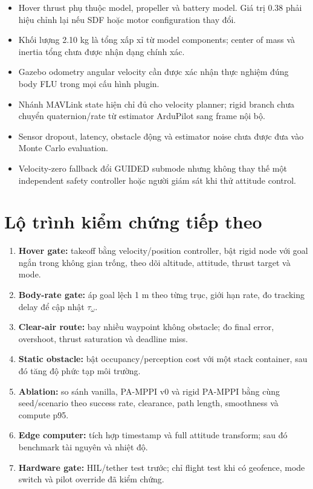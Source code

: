 \documentclass[11pt,a4paper]{article}
\begin{document}
\begin{itemize}
  \item Hover thrust phụ thuộc model, propeller và battery model. Giá trị 0.38
  phải hiệu chỉnh lại nếu SDF hoặc motor configuration thay đổi.
  \item Khối lượng 2.10 kg là tổng xấp xỉ từ model components; center of mass
  và inertia tổng chưa được nhận dạng chính xác.
  \item Gazebo odometry angular velocity cần được xác nhận thực nghiệm đúng
  body FLU trong mọi cấu hình plugin.
  \item Nhánh MAVLink state hiện chỉ đủ cho velocity planner; rigid branch chưa
  chuyển quaternion/rate từ estimator ArduPilot sang frame nội bộ.
  \item Sensor dropout, latency, obstacle động và estimator noise chưa được đưa
  vào Monte Carlo evaluation.
  \item Velocity-zero fallback đổi GUIDED submode nhưng không thay thế một
  independent safety controller hoặc người giám sát khi thử attitude control.
\end{itemize}

\section{Lộ trình kiểm chứng tiếp theo}

\begin{enumerate}
  \item \textbf{Hover gate:} takeoff bằng velocity/position controller, bật
  rigid node với goal ngắn trong không gian trống, theo dõi altitude, attitude,
  thrust target và mode.
  \item \textbf{Body-rate gate:} áp goal lệch 1 m theo từng trục, giới hạn rate,
  đo tracking delay để cập nhật $\tau_\omega$.
  \item \textbf{Clear-air route:} bay nhiều waypoint không obstacle; đo final
  error, overshoot, thrust saturation và deadline miss.
  \item \textbf{Static obstacle:} bật occupancy/perception cost với một stack
  container, sau đó tăng độ phức tạp môi trường.
  \item \textbf{Ablation:} so sánh vanilla, PA-MPPI v0 và rigid PA-MPPI bằng
  cùng seed/scenario theo success rate, clearance, path length, smoothness và
  compute p95.
  \item \textbf{Edge computer:} tích hợp timestamp và full attitude transform;
  sau đó benchmark tài nguyên và nhiệt độ.
  \item \textbf{Hardware gate:} HIL/tether test trước; chỉ flight test khi có
  geofence, mode switch và pilot override đã kiểm chứng.
\end{enumerate}
\end{document}

